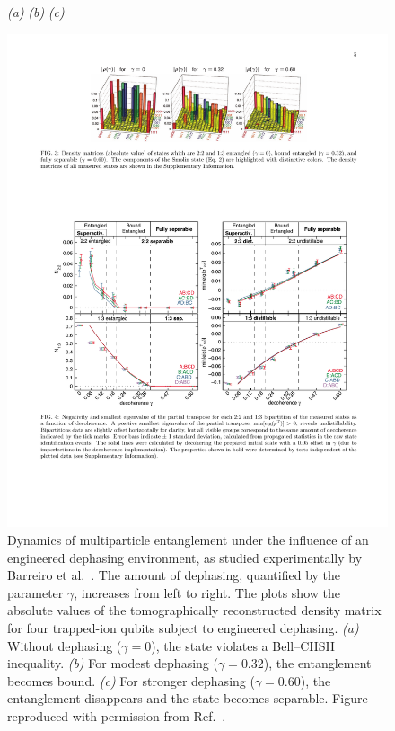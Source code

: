 \documentclass[3p,sort&compress]{elsarticle}
\begin{document}
\begin{figure}
{\footnotesize \hspace{1.4cm}\emph{(a)} \hspace{3.95cm} \emph{(b)} \hspace{3.85cm} \emph{(c)} }

\centering
\includegraphics[scale=1.1]{entan.pdf}
\caption{Dynamics of multiparticle entanglement under the influence of an engineered dephasing environment, as studied experimentally by Barreiro et al.\ \cite{Barreiro:2010:aa}. The amount of dephasing, quantified by the parameter $\gamma$, increases from left to right. The plots show the absolute values of the tomographically reconstructed density matrix for four trapped-ion qubits subject to engineered dephasing. \emph{(a)} Without dephasing  ($\gamma=0$), the state violates a Bell--CHSH inequality. \emph{(b)} For modest dephasing ($\gamma=0.32$), the entanglement becomes bound. \emph{(c)} For stronger dephasing ($\gamma=0.60$), the entanglement disappears and the state becomes separable.  Figure reproduced with permission from Ref.~\cite{Barreiro:2010:aa}. }
\label{fig:entan}
\end{figure}
\end{document}
